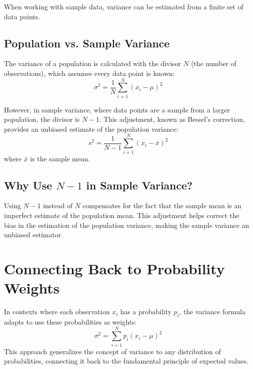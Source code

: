 \documentclass{article}
\begin{document}
When working with sample data, variance can be estimated from a finite set of data points.

\subsection{Population vs. Sample Variance}

The variance of a population is calculated with the divisor \( N \) (the number of observations), which assumes every data point is known:
\[
\sigma^2 = \frac{1}{N} \sum_{i=1}^N (x_i - \mu)^2
\]

However, in sample variance, where data points are a sample from a larger population, the divisor is \( N-1 \). This adjustment, known as Bessel's correction, provides an unbiased estimate of the population variance:
\[
s^2 = \frac{1}{N-1} \sum_{i=1}^N (x_i - \bar{x})^2
\]
where \( \bar{x} \) is the sample mean.

\subsection{Why Use \( N-1 \) in Sample Variance?}

Using \( N-1 \) instead of \( N \) compensates for the fact that the sample mean is an imperfect estimate of the population mean. This adjustment helps correct the bias in the estimation of the population variance, making the sample variance an unbiased estimator.

\section{Connecting Back to Probability Weights}

In contexts where each observation \( x_i \) has a probability \( p_i \), the variance formula adapts to use these probabilities as weights:
\[
\sigma^2 = \sum_{i=1}^N p_i (x_i - \mu)^2
\]
This approach generalizes the concept of variance to any distribution of probabilities, connecting it back to the fundamental principle of expected values.
\end{document}
